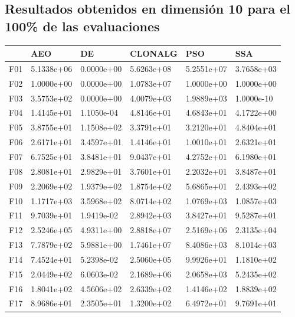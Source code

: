 \documentclass[10pt,a4paper]{article}
\begin{document}
	\subsection{Resultados obtenidos en dimensión 10 para el 100\% de las evaluaciones}
	
	\begin{table}[H]
	\begin{center}	
	\begin{tabular}{llllll}
		\toprule
		{} &         AEO &          DE &       CLONALG &         PSO &         SSA \\
		\midrule
		F01  &  5.1338e+06 &  0.0000e+00 &  5.6263e+08 &  5.2551e+07 &  3.7658e+03 \\
		F02  &  1.0000e+00 &  0.0000e+00 &  1.0783e+07 &  1.0000e+00 &  1.0000e+00 \\
		F03  &  3.5753e+02 &  0.0000e+00 &  4.0079e+03 &  1.9889e+03 &  1.0000e-10 \\
		F04  &  1.4145e+01 &  1.1050e-04 &  4.8146e+01 &  4.6843e+01 &  4.1722e+00 \\
		F05  &  3.8755e+01 &  1.1508e+02 &  3.3791e+01 &  3.2120e+01 &  4.8404e+01 \\
		F06  &  2.6171e+01 &  3.4597e+01 &  1.4146e+01 &  1.0010e+01 &  2.6321e+01 \\
		F07  &  6.7525e+01 &  3.8481e+01 &  9.0437e+01 &  4.2752e+01 &  6.1980e+01 \\
		F08  &  2.8081e+01 &  2.9829e+01 &  3.7601e+01 &  2.2032e+01 &  3.8487e+01 \\
		F09  &  2.2069e+02 &  1.9379e+02 &  1.8754e+02 &  5.6865e+01 &  2.4393e+02 \\
		F10  &  1.1717e+03 &  3.5968e+02 &  8.0714e+02 &  1.0769e+03 &  1.0857e+03 \\
		F11  &  9.7039e+01 &  1.9419e-02 &  2.8942e+03 &  3.8427e+01 &  9.5287e+01 \\
		F12  &  2.5246e+05 &  4.9311e+00 &  2.8818e+07 &  2.5169e+06 &  2.3135e+04 \\
		F13  &  7.7879e+02 &  5.9881e+00 &  1.7461e+07 &  8.4086e+03 &  8.1014e+03 \\
		F14  &  7.4524e+01 &  5.2398e-02 &  2.5060e+05 &  9.9926e+01 &  1.1810e+02 \\
		F15  &  2.0449e+02 &  6.0603e-02 &  2.1689e+06 &  2.0658e+03 &  5.2435e+02 \\
		F16  &  1.8041e+02 &  4.5606e+02 &  2.6339e+02 &  1.4146e+02 &  1.8839e+02 \\
		F17  &  8.9686e+01 &  2.3505e+01 &  1.3200e+02 &  6.4972e+01 &  9.7691e+01 \\

\end{tabular}
\end{center}
\end{table}
\end{document}
